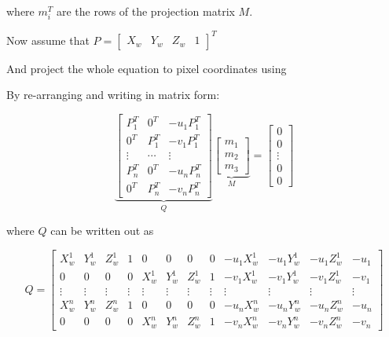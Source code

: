 \documentclass[10pt,a4paper]{scrartcl}
\begin{document}
\begin{multicols*}{2}
where $m_i^T$ are the rows of the projection matrix $M$.

Now assume that $P=\begin{bmatrix}
X_w&Y_w&Z_w&1
\end{bmatrix}^T$

And project the whole equation to pixel coordinates using


\vspace{3ex}

By re-arranging and writing in matrix form:

\begin{equation*}
\underbrace{
\begin{bmatrix}
P_1^T&0^T&-u_1P_1^T\\
0^T&P_1^T&-v_1P_1^T\\
\vdots&\cdots&\vdots\\
P_n^T&0^T&-u_nP_n^T\\
0^T&P_n^T&-v_nP_n^T
\end{bmatrix}}_Q
\underbrace{\begin{bmatrix}
m_1\\m_2\\m_3
\end{bmatrix}}_M=
\begin{bmatrix}
0\\0\\\vdots\\0\\0
\end{bmatrix}
\end{equation*}

where $Q$ can be written out as

\setcounter{MaxMatrixCols}{20}
\begin{equation*}
Q=\begin{bmatrix}
X_w^1&Y_w^1&Z_w^1&1&0&0&0&0&-u_1X_w^1&-u_1Y_w^1&-u_1Z_w^1&-u_1\\
0&0&0&0&X_w^1&Y_w^1&Z_w^1&1&-v_1X_w^1&-v_1Y_w^1&-v_1Z_w^1&-v_1\\
\vdots&\vdots&\vdots&\vdots&\vdots&\vdots&\vdots&\vdots&\vdots&\vdots&\vdots&\vdots\\
X_w^n&Y_w^n&Z_w^n&1&0&0&0&0&-u_nX_w^n&-u_nY_w^n&-u_nZ_w^n&-u_n\\
0&0&0&0&X_w^n&Y_w^n&Z_w^n&1&-v_nX_w^n&-v_nY_w^n&-v_nZ_w^n&-v_n
\end{bmatrix}
\end{equation*}


\end{multicols*}
\end{document}
